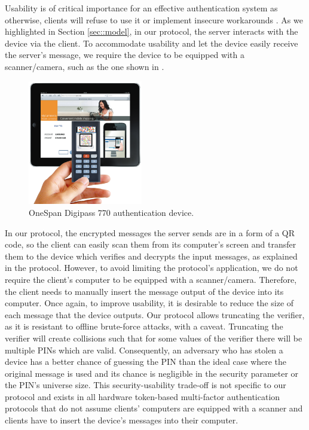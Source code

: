 \documentclass[runningheads]{llncs}
\begin{document}
Usability is of critical importance for an effective authentication system as otherwise, clients will refuse to use it or implement insecure workarounds \cite{de2013comparative}.
As we highlighted in Section \ref{sec::model}, in our protocol, the server interacts with the device via the client. To accommodate usability and let the device easily receive the server's message, we require the device to be equipped with a scanner/camera, such as the one shown in . 

\vspace{-3mm}
\begin{figure}
    \centering
    \includegraphics[width=5cm]{dp770}
    \caption{OneSpan Digipass 770 authentication device.}
    \label{fig:dp770}
\end{figure}
\vspace{-3mm}

In our protocol, the encrypted messages the server sends are in a form of a QR code, so the client can easily scan them from its computer's screen and transfer them to the device which verifies and decrypts the input messages, as explained in the protocol. However, to avoid limiting the protocol's application, we do not require the client's computer to be equipped with a scanner/camera. Therefore, the client needs to manually insert the message output of the device into its computer.  Once again, to improve usability, it is desirable to reduce the size of each message that the device outputs. {Our protocol allows truncating the verifier, as it is resistant to offline brute-force attacks, with a caveat. Truncating the verifier will create collisions such that for some values of the verifier there will be multiple PINs which are valid. Consequently, an adversary who has stolen a device has a better chance of guessing the PIN than the ideal case where the original message is used and its chance is negligible in the security parameter or the PIN's universe size.} This security-usability trade-off is not specific to our protocol and exists in all hardware token-based multi-factor authentication protocols that do not assume clients' computers are equipped with a scanner and clients have to insert the device's messages into their computer.  
\end{document}
